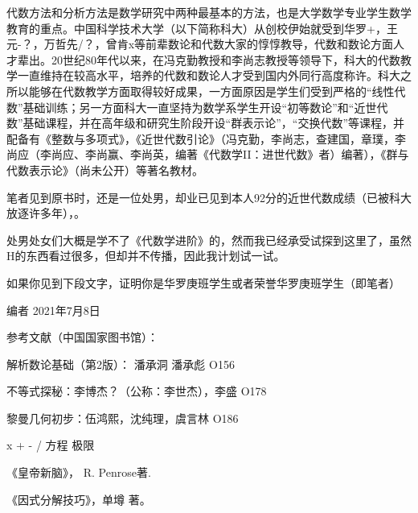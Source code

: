 代数方法和分析方法是数学研究中两种最基本的方法，也是大学数学专业学生数学教育的重点。中国科学技术大学（以下简称科大）从创校伊始就受到华罗+，王元-？，万哲先/？，曾肯x等前辈数论和代数大家的惇惇教导，代数和数论方面人才辈出。20世纪80年代以来，在冯克勤教授和李尚志教授等领导下，科大的代数教学一直维持在较高水平，培养的代数和数论人才受到国内外同行高度称许。科大之所以能够在代数教学方面取得较好成果，一方面原因是学生们受到严格的“线性代数”基础训练；另一方面科大一直坚持为数学系学生开设“初等数论”和“近世代数”基础课程，并在高年级和研究生阶段开设“群表示论”，“交换代数”等课程，并配备有《整数与多项式》，《近世代数引论》（冯克勤，李尚志，查建国，章璞，李尚应（李尚应、李尚赢、李尚英，编著《代数学II：进世代数》者）编著），《群与代数表示论》（尚未公开）等著名教材。

笔者见到原书时，还是一位处男，却业已见到本人92分的近世代数成绩（已被科大放逐许多年），。

处男处女们大概是学不了《代数学进阶》的，然而我已经承受试探到这里了，虽然H的东西看过很多，但却并不传播，因此我计划试一试。

如果你见到下段文字，证明你是华罗庚班学生或者荣誉华罗庚班学生（即笔者）

编者 2021年7月8日




参考文献（中国国家图书馆）：

解析数论基础（第2版）： 潘承洞 潘承彪 O156

不等式探秘：李博杰？（公称：李世杰），李盛 O178

黎曼几何初步：伍鸿熙，沈纯理，虞言林  O186

x + - / 方程 极限

《皇帝新脑》， R. Penrose著.

《因式分解技巧》，单墫 著。
